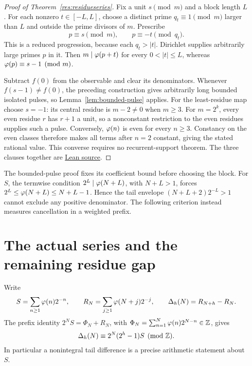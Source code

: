 \documentclass[11pt]{article}
\begin{document}
\begin{proof}[Proof of Theorem~\ref{res:residueseries}]
Fix a unit $s\pmod m$ and a block length $L$. For each nonzero
$t\in[-L,L]$, choose a distinct prime $q_t\equiv1\pmod m$ larger than $L$
and outside the prime divisors of $m$. Prescribe
\[
 p\equiv s\pmod m,\qquad p\equiv-t\pmod{q_t}.
\]
This is a reduced progression, because each $q_t>|t|$. Dirichlet supplies
arbitrarily large primes $p$ in it. Then $m\mid\varphi(p+t)$ for every
$0<|t|\le L$, whereas $\varphi(p)\equiv s-1\pmod m$.

Subtract $f(0)$ from the observable and clear its denominators. Whenever
$f(s-1)\ne f(0)$, the preceding construction gives arbitrarily long bounded
isolated pulses, so Lemma~\ref{lem:bounded-pulse} applies. For the
least-residue map choose $s=-1$: its central residue is $m-2\ne0$ when
$m\ge3$. For $m=2^k$, every even residue $r$ has $r+1$ a unit, so a
nonconstant restriction to the even residues supplies such a pulse.
Conversely, $\varphi(n)$ is even for every $n\ge3$. Constancy on the even
classes therefore makes all terms after $n=2$ constant, giving the stated
rational value. This converse requires no recurrent-support theorem.
The three clauses together are
\href{https://github.com/wcook04/plectis-erdos/blob/f36a98bf3d3e6f65f1074e3b800e3293d5b8a51a/ErdosProblems/Erdos249/PaperCompleteR7/RationalObservableClassification.lean#L277}{Lean source}.
\end{proof}
The bounded-pulse proof fixes its coefficient bound before choosing the block.
For $S$, the termwise condition $2^L\mid\varphi(N+L)$, with $N+L>1$, forces
$2^L\le\varphi(N+L)\le N+L-1$. Hence the tail envelope
$(N+L+2)2^{-L}>1$ cannot exclude any positive denominator.
The following criterion instead measures cancellation in a weighted prefix.

\section{The actual series and the remaining residue gap}\label{sec:carry-rank}
Write
\[
 S=\sum_{n\ge1}\varphi(n)2^{-n},\qquad
 R_N=\sum_{j\ge1}\varphi(N+j)2^{-j},\qquad
 \Delta_h(N)=R_{N+h}-R_N.
\]
The prefix identity $2^NS=\Phi_N+R_N$, with
$\Phi_N=\sum_{n=1}^N\varphi(n)2^{N-n}\in\mathbb{Z}$, gives
\begin{equation}\label{eq:tail-phase}
 \Delta_h(N)\equiv2^N(2^h-1)S\pmod{\mathbb{Z}}.
\end{equation}
In particular a nonintegral tail difference is a precise arithmetic
statement about $S$.
\end{document}
